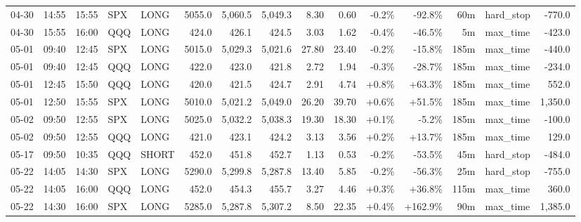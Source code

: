 \documentclass[11pt,a4paper,twoside]{article}
\begin{document}
\begin{landscape}
\begin{center}
\begin{longtable}{>{\color{txtmain}}l l l l l r r r r r r r r >{\color{txtmain}}l r}
04-30 & 14:55 & 15:55 & SPX & LONG & 5055.0 & 5,060.5 & 5,049.3 & 8.30 & 0.60 & \textcolor{lossred}{-0.2\%} & \textcolor{lossred}{-92.8\%} & 60m & hard\_stop & \textcolor{lossred}{-770.0} \\
04-30 & 15:55 & 16:00 & QQQ & LONG & 424.0 & 426.1 & 424.5 & 3.03 & 1.62 & \textcolor{lossred}{-0.4\%} & \textcolor{lossred}{-46.5\%} & 5m & max\_time & \textcolor{lossred}{-423.0} \\
05-01 & 09:40 & 12:45 & SPX & LONG & 5015.0 & 5,029.3 & 5,021.6 & 27.80 & 23.40 & \textcolor{lossred}{-0.2\%} & \textcolor{lossred}{-15.8\%} & 185m & max\_time & \textcolor{lossred}{-440.0} \\
05-01 & 09:40 & 12:45 & QQQ & LONG & 422.0 & 423.0 & 421.8 & 2.72 & 1.94 & \textcolor{lossred}{-0.3\%} & \textcolor{lossred}{-28.7\%} & 185m & max\_time & \textcolor{lossred}{-234.0} \\
05-01 & 12:45 & 15:50 & QQQ & LONG & 420.0 & 421.5 & 424.7 & 2.91 & 4.74 & \textcolor{wingreen}{+0.8\%} & \textcolor{wingreen}{+63.3\%} & 185m & max\_time & \textcolor{wingreen}{552.0} \\
05-01 & 12:50 & 15:55 & SPX & LONG & 5010.0 & 5,021.2 & 5,049.0 & 26.20 & 39.70 & \textcolor{wingreen}{+0.6\%} & \textcolor{wingreen}{+51.5\%} & 185m & max\_time & \textcolor{wingreen}{1,350.0} \\
05-02 & 09:50 & 12:55 & SPX & LONG & 5025.0 & 5,032.2 & 5,038.3 & 19.30 & 18.30 & \textcolor{wingreen}{+0.1\%} & \textcolor{lossred}{-5.2\%} & 185m & max\_time & \textcolor{lossred}{-100.0} \\
05-02 & 09:50 & 12:55 & QQQ & LONG & 421.0 & 423.1 & 424.2 & 3.13 & 3.56 & \textcolor{wingreen}{+0.2\%} & \textcolor{wingreen}{+13.7\%} & 185m & max\_time & \textcolor{wingreen}{129.0} \\
05-17 & 09:50 & 10:35 & QQQ & SHORT & 452.0 & 451.8 & 452.7 & 1.13 & 0.53 & \textcolor{lossred}{-0.2\%} & \textcolor{lossred}{-53.5\%} & 45m & hard\_stop & \textcolor{lossred}{-484.0} \\
05-22 & 14:05 & 14:30 & SPX & LONG & 5290.0 & 5,299.8 & 5,287.8 & 13.40 & 5.85 & \textcolor{lossred}{-0.2\%} & \textcolor{lossred}{-56.3\%} & 25m & hard\_stop & \textcolor{lossred}{-755.0} \\
05-22 & 14:05 & 16:00 & QQQ & LONG & 452.0 & 454.3 & 455.7 & 3.27 & 4.46 & \textcolor{wingreen}{+0.3\%} & \textcolor{wingreen}{+36.8\%} & 115m & max\_time & \textcolor{wingreen}{360.0} \\
05-22 & 14:30 & 16:00 & SPX & LONG & 5285.0 & 5,287.8 & 5,307.2 & 8.50 & 22.35 & \textcolor{wingreen}{+0.4\%} & \textcolor{wingreen}{+162.9\%} & 90m & max\_time & \textcolor{wingreen}{1,385.0} \\

\end{longtable}
\end{center}
\end{landscape}
\end{document}
